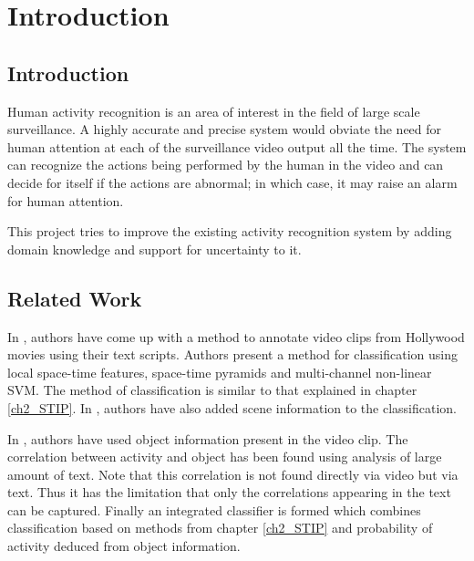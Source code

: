 \chapter{Introduction}

\label{ch1_INTRO}






\section{Introduction}
Human activity recognition is an area of interest in the field of large scale surveillance.
A highly accurate and precise system would obviate the need for human attention
at each of the surveillance video output all the time. The system can recognize the
actions being performed by the human in the video and can decide for itself if the actions are abnormal;
in which case, it may raise an alarm for human attention.

This project tries to improve the existing activity recognition system
by adding domain knowledge and support for uncertainty to it.

\begin{comment}
\begin{figure}[here]
\begin{center}	
\texttt{[image: pent]} 
\caption{Pentagon $pqrst$}
\label{fig:pent}
\end{center}
\end{figure}
\end{comment}




\section{Related Work}
In \cite{Realistic}, authors have come up with a method to annotate video clips 
from Hollywood movies using their text scripts.
Authors present a method for classification using local space-time features, space-time pyramids 
and multi-channel non-linear SVM. The method of classification is similar to that explained in chapter \ref{ch2_STIP}. 
In \cite{actionsInContext}, authors have also added scene information to the classification.

In \cite{improving}, authors have used object information present in the video clip. 
The correlation between activity and object has been found using analysis of large amount of text. 
Note that this correlation is not found directly via video but via text.
Thus it has the limitation that only the correlations appearing in the text can be captured.
Finally an integrated classifier is formed which combines classification based on methods from chapter \ref{ch2_STIP} 
and probability of activity deduced from object information.









